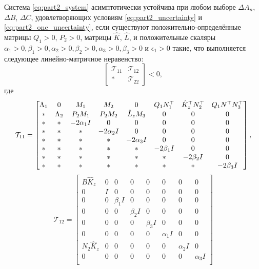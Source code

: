 \begin{theorem}\label{thm:part2_LMI_1}
	Система \eqref{eq:part2_system} асимптотически устойчива при любом выборе $\Delta {A}_n$, $\Delta {B}$, $\Delta {C}$, удовлетворяющих условиям \eqref{eq:part2_uncertainty} и \eqref{eq:part2_one_uncertainty}, если существуют положительно-определённые матрицы ${Q}_1>0$, ${P}_2>0$, матрицы $\hat{{K}}$, $\hat{{L}}$,
	и положительные скаляры $\alpha_1>0,\beta_1>0,\alpha_2>0,\beta_2>0,\alpha_3>0,\beta_3>0$ и $\epsilon_1 > 0$ такие, что выполняется следующее линейно-матричное неравенство:
	\begin{equation}
		\label{eq:thm3_final_LMI}
		\begin{bmatrix}
			\mathcal{T}_{11} & \mathcal{T}_{12} \\
			* & \mathcal{T}_{22}
		\end{bmatrix}<0,
	\end{equation}
	где
	\begin{equation}
		\mathcal{T}_{11}= \begin{bmatrix}
			{\Lambda}_1 & 0 & {M}_1 & {M}_2&0 & {Q}_1{N}_1^\top & \hat{{K}}_z^\top{N}_2^\top & {Q}_1 {N}^\top{N}_3^\top \\
			* & {\Lambda}_2 & {P}_2{M}_1 & {P}_2{M}_2 & \hat{{L}}_z{M}_3& 0& 0&0\\
			* & * & -2\alpha_1{I} & 0&0&0&0&0\\
			* & * &*  & -2\alpha_2{I}&0&0&0&0\\
			*& * & * &*  &-2\alpha_3{I}&0&0&0\\
			* &* & * & * & *&-2\beta_1{I}&0&0\\
			* & * & * &*& *&*&-2\beta_2{I}& 0\\
			*&*&* &* & * & * & *&-2\beta_3{I}\\
		\end{bmatrix},
	\end{equation}
	\begin{equation}
		\mathcal{T}_{12}= \begin{bmatrix}
			{B}\hat{{K}}_z & 0&0&0&0&0&0&0\\
			0&{I}&0&0&0&0&0&0\\
			0&0& \beta_1{I}&0&0&0&0&0\\
			0&0&0& \beta_2{I}&0&0&0&0\\
			0&0&0&0&\beta_3{I}&0&0&0\\
			0&0&0&0&0& \alpha_1{I}&0&0\\
			{N}_2\hat{{K}}_z&0&0&0&0&0& \alpha_2{I}&0\\
			0&0&0&0&0&0&0&\alpha_3{I}\\

\end{bmatrix}
\end{equation}
\end{theorem}
